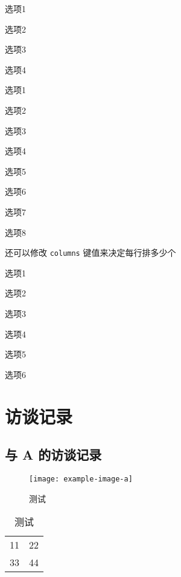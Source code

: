 \begin{choices}[label = \Roman*-]
  \item 选项1
  \item 选项2
  \item 选项3
  \item 选项4
\end{choices}

\begin{choices}[label = \circlednumber*]
  \item 选项1
  \item 选项2
  \item 选项3
  \item 选项4
  \item 选项5
  \item 选项6
  \item 选项7
  \item 选项8
\end{choices}


还可以修改 \verb|columns| 键值来决定每行排多少个
\begin{choices}[
  columns = 3,            %
  label = (\arabic*)      %
]
  \item 选项1
  \item 选项2
  \item 选项3
  \item 选项4
  \item 选项5
  \item 选项6
\end{choices}



\chapter{访谈记录}


\section{与 A 的访谈记录}

\begin{figure}[htbp]
  \centering
  \texttt{[image: example-image-a]}
  \caption{测试}
  \label{figure:test2}
\end{figure}

\begin{table}[htbp]
  \centering
  \caption{测试}
  \label{table:test2}
  \begin{tabular}{|c|c|}
    11 & 22 \\
    33 & 44 
  \end{tabular}
\end{table}

